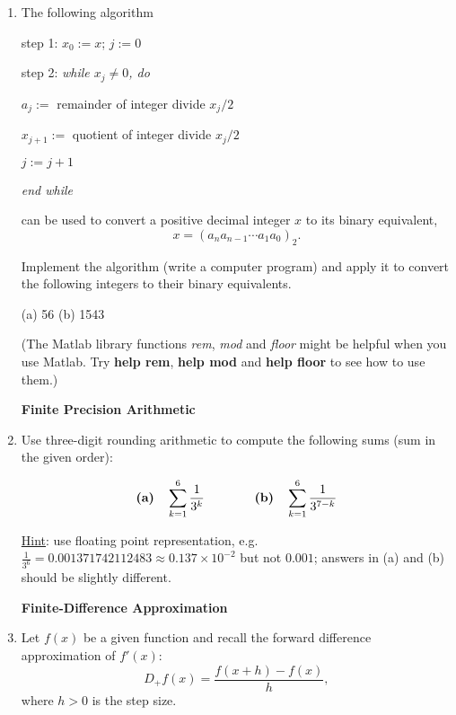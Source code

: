 \documentclass [12pt]{article}
\begin{document}
\begin{enumerate}
\item The following algorithm

step 1: $x_0 := x$; $j:=0$

step 2: {\it while $x_j \not= 0$, do}

\hskip 60pt $a_j :=$ remainder of integer divide $x_j/2$

\hskip 60pt $x_{j+1} :=$ quotient of integer divide $x_j/2$

\hskip 60pt $j:=j+1$

\hskip 40pt {\it end while}

\noindent can be used to convert a positive decimal integer $x$ to
its binary equivalent,
$$x=(a_na_{n-1}\cdots a_1a_0)_2.$$


\smallskip
\noindent Implement the algorithm (write a computer program) and
apply it to convert the following integers to their binary
equivalents.

(a) 56 \hskip 15pt (b) 1543

\bigskip

\smallskip
\noindent (The Matlab library functions {\it rem}, {\it mod} and
{\it floor} might be helpful when you use Matlab. Try {\bf help
rem}, {\bf help mod} and {\bf help floor} to see how to use them.)

\bigskip

\hspace*{-15pt}
{\bf  Finite Precision Arithmetic}

\item Use three-digit rounding arithmetic to compute the following
sums (sum in the given order):

\[
\mbox{\bf(a)} \quad \sum_{k=1}^6\frac{1}{3^k} \qquad \qquad
\mbox{\bf(b)} \quad \sum_{k=1}^6\frac{1}{3^{7-k}}
\]

\underline{Hint}: use floating point representation, e.g. $\frac{1}{3^6}=0.001371742112483 \approx 0.137\times 10^{-2}$ but not $0.001$; answers in (a) and (b) should be slightly different. 

\bigskip

\hspace*{-15pt}
{\bf Finite-Difference Approximation}

\item Let $f(x)$ be a given function and recall the forward difference approximation of $f'(x)$:
%
\[
D_+f(x)=\frac{f(x+h)-f(x)}{h},
\]
%
where $h>0$ is the step size.


\end{enumerate}
\end{document}
